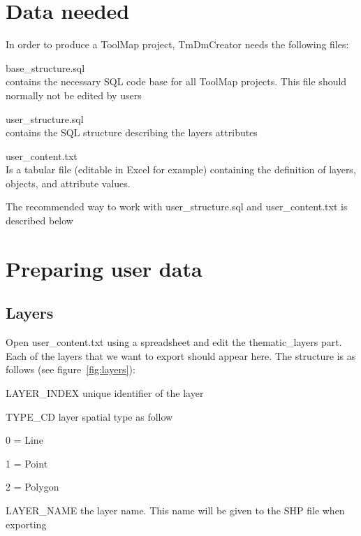 \documentclass[a4paper, 12pt]{article}
\begin{document}
\section{Data needed}
In order to produce a ToolMap project, TmDmCreator needs the following files:
    \begin{description*}
  \item[base\_structure.sql]\hfill \\ contains the necessary SQL code base for all ToolMap projects. This file should normally not be edited by users
  \item[user\_structure.sql]\hfill \\ contains the SQL structure describing the layers attributes
  \item[user\_content.txt]\hfill \\ Is a tabular file (editable in Excel for example) containing the definition of layers, objects, and attribute values.
\end{description*}
The recommended way to work with user\_structure.sql and user\_content.txt is described below


\section{Preparing user data}

\subsection{Layers}
Open user\_content.txt using a spreadsheet and edit the thematic\_layers part. Each of the layers that we want to export should appear here. The structure is as follows (see figure~\ref{fig:layers}):
\begin{description*}
  \item [LAYER\_INDEX] unique identifier of the layer
  \item [TYPE\_CD] layer spatial type as follow
    \begin{description*}
      \item [0] = Line
      \item [1] = Point
      \item [2] = Polygon
    \end{description*}
  \item [LAYER\_NAME] the layer name. This name will be given to the SHP file when exporting
\end{description*}
\end{document}
